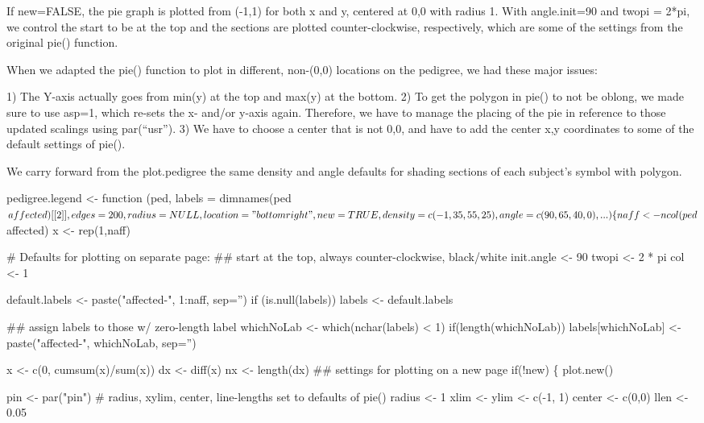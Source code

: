\documentclass{article}
\begin{document}
\begin{enumerate}
If new=FALSE, the pie graph is plotted from (-1,1) for both x and y, centered 
at 0,0 with radius 1. With angle.init=90 and twopi = 2*pi, we control the 
start to be at the top and the sections are plotted counter-clockwise, respectively, which are some of the settings from the original pie() function.  

When we adapted the pie() function to plot in different, non-(0,0) locations
on the pedigree, we had these major issues:

1) The Y-axis actually goes from min(y) at the top and max(y) at the bottom.
2) To get the polygon in pie() to not be oblong, we made sure to use asp=1, 
which re-sets the x- and/or y-axis again.  Therefore, we have to manage the 
placing of the pie in reference to those updated scalings using par(``usr'').
3) We have to choose a center that is not 0,0, and have to add the center
x,y coordinates to some of the default settings of pie().

We carry forward from the plot.pedigree the same density and angle defaults
for shading sections of each subject's symbol with polygon.  


\nwenddocs{}\endmoddef

pedigree.legend <- function (ped, labels = dimnames(ped$affected)[[2]],
    edges = 200, radius=NULL, location="bottomright", new=TRUE,
    density = c(-1, 35, 55, 25),  angle = c(90, 65, 40, 0), ...) 
\{
   
    naff <- ncol(ped$affected)
    x <- rep(1,naff)
    
    # Defaults for plotting on separate page:
    ## start at the top, always counter-clockwise, black/white
    init.angle <- 90
    twopi <- 2 * pi
    col <- 1

    default.labels <- paste("affected-", 1:naff, sep='')
    if (is.null(labels)) labels <- default.labels
    
    ## assign labels to those w/ zero-length label
    whichNoLab <- which(nchar(labels) < 1)
    if(length(whichNoLab))
      labels[whichNoLab] <- paste("affected-", whichNoLab, sep='')

    
    x <- c(0, cumsum(x)/sum(x))
    dx <- diff(x)
    nx <- length(dx)
    ## settings for plotting on a new page
    if(!new) \{
      plot.new()
      
      pin <- par("pin")
      # radius, xylim, center, line-lengths set to defaults of pie()
      radius <- 1
      xlim <- ylim <- c(-1, 1)
      center <- c(0,0)
      llen <- 0.05
      

\end{enumerate}
\end{document}
